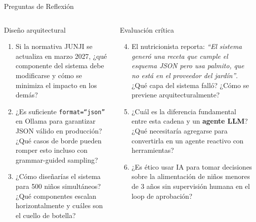 \documentclass[aspectratio=169]{beamer}
\begin{document}
\begin{frame}{Preguntas de Reflexión}
  \begin{columns}
    \begin{block}{Diseño arquitectural}
      \begin{enumerate}
        \item Si la normativa JUNJI se actualiza en marzo 2027,
              ¿qué componente del sistema debe modificarse y cómo
              se minimiza el impacto en los demás?
        \vspace{0.35em}
        \item ¿Es suficiente \texttt{format=``json''} en Ollama para
              garantizar JSON válido en producción? ¿Qué casos de borde
              pueden romper esto incluso con grammar-guided sampling?
        \vspace{0.35em}
        \item ¿Cómo diseñarías el sistema para 500 niños simultáneos?
              ¿Qué componentes escalan horizontalmente y cuáles son
              el cuello de botella?
      \end{enumerate}
    \end{block}
    \begin{exampleblock}{Evaluación crítica}
      \begin{enumerate}
        \setcounter{enumi}{3}
        \item El nutricionista reporta: \textit{``El sistema generó una
              receta que cumple el esquema JSON pero usa palmito, que
              no está en el proveedor del jardín''}. ¿Qué capa del
              sistema falló? ¿Cómo se previene arquitecturalmente?
        \vspace{0.35em}
        \item ¿Cuál es la diferencia fundamental entre esta cadena
              y un \textbf{agente LLM}? ¿Qué necesitaría agregarse
              para convertirla en un agente reactivo con herramientas?
        \vspace{0.35em}
        \item ¿Es ético usar IA para tomar decisiones sobre la
              alimentación de niños menores de 3 años sin supervisión
              humana en el loop de aprobación?
      \end{enumerate}
    \end{exampleblock}
  \end{columns}
\end{frame}
\end{document}
